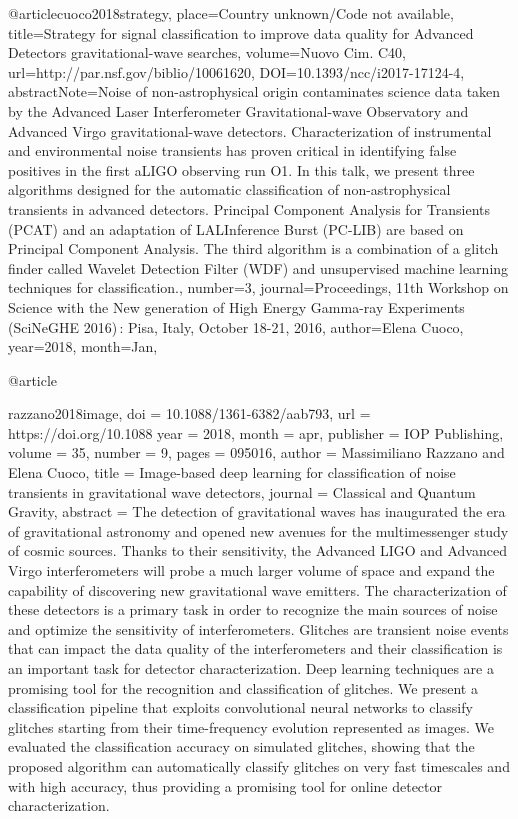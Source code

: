 {{{{{@article{cuoco2018strategy, 
  place={Country unknown/Code not available}, 
  title={Strategy for signal classification to improve data quality for Advanced Detectors gravitational-wave searches}, 
  volume={Nuovo Cim. C40}, 
  url={http://par.nsf.gov/biblio/10061620}, 
  DOI={10.1393/ncc/i2017-17124-4}, 
  abstractNote={Noise of non-astrophysical origin contaminates science data taken by the Advanced Laser Interferometer Gravitational-wave Observatory and Advanced Virgo gravitational-wave detectors. Characterization of instrumental and environmental noise transients has proven critical in identifying false positives in the first aLIGO observing run O1. In this talk, we present three algorithms designed for the automatic classification of non-astrophysical transients in advanced detectors. Principal Component Analysis for Transients (PCAT) and an adaptation of LALInference Burst (PC-LIB) are based on Principal Component Analysis. The third algorithm is a combination of a glitch finder called Wavelet Detection Filter (WDF) and unsupervised machine learning techniques for classification.}, 
  number={3}, 
  journal={Proceedings, 11th Workshop on Science with the New generation of High Energy Gamma-ray Experiments (SciNeGHE 2016) : Pisa, Italy, October 18-21, 2016}, 
  author={Elena Cuoco}, 
  year={2018}, 
  month={Jan},
}

@article{razzano2018image,
	doi = {10.1088/1361-6382/aab793},
	url = {https://doi.org/10.1088%
	year = 2018,
	month = {apr},
	publisher = {{IOP} Publishing},
	volume = {35},
	number = {9},
	pages = {095016},
	author = {Massimiliano Razzano and Elena Cuoco},
	title = {Image-based deep learning for classification of noise transients in gravitational wave detectors},
	journal = {Classical and Quantum Gravity},
	abstract = {The detection of gravitational waves has inaugurated the era of gravitational astronomy and opened new avenues for the multimessenger study of cosmic sources. Thanks to their sensitivity, the Advanced LIGO and Advanced Virgo interferometers will probe a much larger volume of space and expand the capability of discovering new gravitational wave emitters. The characterization of these detectors is a primary task in order to recognize the main sources of noise and optimize the sensitivity of interferometers. Glitches are transient noise events that can impact the data quality of the interferometers and their classification is an important task for detector characterization. Deep learning techniques are a promising tool for the recognition and classification of glitches. We present a classification pipeline that exploits convolutional neural networks to classify glitches starting from their time-frequency evolution represented as images. We evaluated the classification accuracy on simulated glitches, showing that the proposed algorithm can automatically classify glitches on very fast timescales and with high accuracy, thus providing a promising tool for online detector characterization.}
}


}}}}}}
